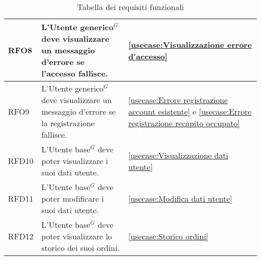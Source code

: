 \begin{table}[H]
\begin{tabularx}{\textwidth}{l|X|p{2cm}}
		\hline
		RFO8        & L'\gls{Utente generico}$^G$ deve visualizzare un messaggio d'errore se l'accesso fallisce.                           & \autoref{usecase:Visualizzazione errore d'accesso}                                                                                                           \\
		\hline
		RFO9        & L'\gls{Utente generico}$^G$ deve visualizzare un messaggio d'errore se la registrazione fallisce.                    & \autoref{usecase:Errore registrazione account esistente} e \autoref{usecase:Errore registrazione recapito occupato}                                          \\
		\hline
		RFD10       & L'\gls{Utente base}$^G$ deve poter visualizzare i suoi dati utente.                                                  & \autoref{usecase:Visualizzazione dati utente}                                                                                                                \\
		\hline
		RFD11       & L'\gls{Utente base}$^G$ deve poter modificare i suoi dati utente.                                                    & \autoref{usecase:Modifica dati utente}                                                                                                                       \\
		\hline
		RFD12       & L'\gls{Utente base}$^G$ deve poter visualizzare lo storico dei suoi ordini.                                          & \autoref{usecase:Storico ordini}                                                                                                                             \\
	\end{tabularx}
	\caption{Tabella dei requisiti funzionali}
\end{table}


